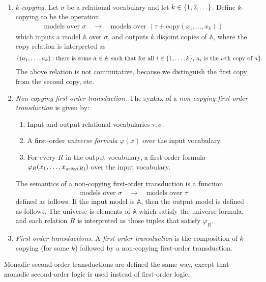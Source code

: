 \begin{definition}\label{def:fo-transduction}\ 
\begin{enumerate}
    \item \emph{$k$-copying.} Let $\sigma$ be a relational vocabulary and let $k \in \{1,2,\ldots\}$. Define $k$-copying to be the operation 
    \begin{align*}
        \text{models over $\sigma$} \quad \to \quad \text{models over $(\tau + \mathrm{copy}(x_1,\ldots,x_k))$}
    \end{align*}
which inputs a model $\mathbb A$ over $\sigma$, and outputs $k$ disjoint copies of $\mathbb A$, where the  $\mathrm{copy}$ relation is interpreted as
\begin{align*}
\{(a_1,\ldots,a_k) : \text{there is  some $a \in \mathbb A$ such that for all $i \in \{1,\ldots,k\}$, $a_i$ is the $i$-th copy of $a$}\}.
\end{align*}
The above relation is not commutative, because we distinguish the first copy from the second copy, etc.
\item    \emph{Non-copying first-order transduction.} The syntax of a \emph{non-copying first-order transduction}  is given by:
\begin{enumerate}
    \item Input and output relational vocabularies $\tau,\sigma$.
    \item A first-order \emph{universe formula} $\varphi(x)$ over the input vocabulary.
    \item For   every $R$ in the output vocabulary, a first-order  formula $\varphi_R(x_1,\ldots,x_{\mathrm{arity}(R)})$ over the input vocabulary.
\end{enumerate}
The semantics of a non-copying first-order transduction is  a function
\begin{align*}
    \text{models over $\sigma$} \quad \to \quad \text{models over $\tau$}
\end{align*}
defined as follows. If the input model is $\mathbb A$, then the output model is defined as follows. The universe is elements of $\mathbb A$ which satisfy the universe formula, and each relation $R$ is interpreted as those tuples that satisfy $\varphi_R$. 
\item \emph{First-order transductions.} A \emph{first-order transduction} is the composition of $k$-copying (for some $k$) followed by a non-copying first-order transduction. 
 \end{enumerate}
Monadic second-order transductions are defined the same way, except that monadic second-order logic is used instead of first-order logic.
\end{definition}



